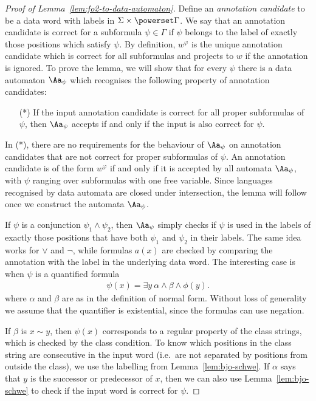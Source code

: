 \begin{proof}[Proof of Lemma~\ref{lem:fo2-to-data-automaton}] Define an \emph{annotation candidate} to be a data word with labels in $\Sigma \times \powerset \Gamma$. We say that an annotation candidate is correct for a subformula $\psi \in \Gamma$ if $\psi$ belongs to the label of exactly those positions which satisfy $\psi$. By definition, $w^\varphi$ is the unique annotation candidate which is correct for all subformulas and projects to $w$ if the annotation is ignored. To prove the lemma, we will show that for every $\psi$ there is a data automaton $\Aa_\psi$ which recognises the following property of annotation candidates:
	\begin{itemize}
		\item[(*)] If the input annotation candidate is correct for all proper subformulas of $\psi$, then $\Aa_\psi$ accepts if and only if the input is also correct for $\psi$. 
	\end{itemize}
	In (*), there are no requirements for the behaviour of $\Aa_\psi$ on annotation candidates that are not correct for proper subformulas of $\psi$. An annotation candidate is of the form $w^\varphi$ if and only if it is accepted by all automata $\Aa_\psi$, with $\psi$ ranging over subformulas with one free variable. Since languages recognised by data automata are closed under intersection, the lemma will follow once we construct the automata $\Aa_\psi$. 

	 If $\psi$ is a conjunction $\psi_1 \land \psi_2$, then $\Aa_\psi$ simply checks if $\psi$ is used in the labels of exactly those positions that have both $\psi_1$ and $\psi_2$ in their labels. The same idea works for $\lor$ and $\neg$, while formulas $a(x)$ are checked by comparing the annotation with the label in the underlying data word. The interesting case is when $\psi$ is a quantified formula
	\begin{align*}
		\psi(x) = \exists y\ \alpha \land \beta \land 
		\phi(y).
	\end{align*}
where $\alpha$ and $\beta$ are as in the definition of normal form. Without loss of generality we assume that the quantifier is existential, since the formulas can use negation. 

If $\beta$ is $x \sim y$, then $\psi(x)$ corresponds to a regular property of the class strings, which is checked by the class condition. To know which positions in the class string are consecutive in the input word (i.e.~are not separated by positions from outside the class), we use the labelling from Lemma~\ref{lem:bjo-schwe}. If $\alpha$ says that $y$ is the successor or predecessor of $x$, then we can also use Lemma~\ref{lem:bjo-schwe} to check if the input word is correct for $\psi$.


\end{proof}

